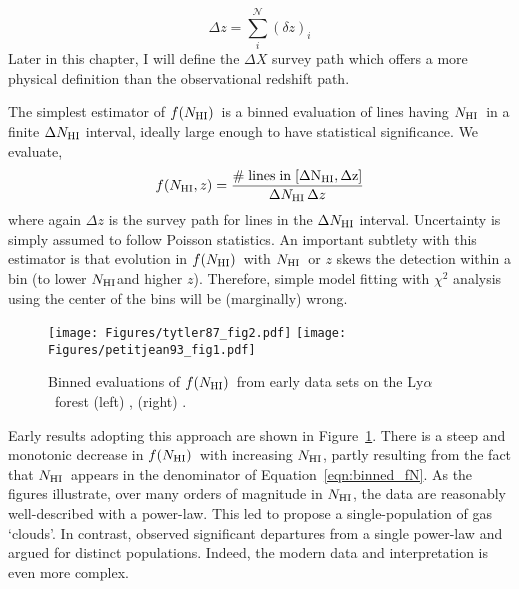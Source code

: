 \documentclass[graybox]{svmult}
\def\lya{Ly$\alpha$}
\def\smm{\sum\limits}
\newcommand{\mnhi}{N_{\rm HI}}
\newcommand{\nhi}{$\mnhi$}
\def\mfnhi{f(\mnhi)}
\def\fnhi{$\mfnhi$}
\begin{document}
\begin{equation}
\Delta z = \smm_i^{\mathcal{N}} (\delta z)_i
\label{eqn:survey_path}
\end{equation}
Later in this chapter,
I will define the $\Delta X$ survey path which offers
a more physical definition than the observational redshift path.

The simplest estimator of \fnhi\ is a binned evaluation
of lines having \nhi\ in a finite $\Delta \mnhi$ interval,
ideally large enough to have statistical significance.
We evaluate,
\begin{equation}
f(\mnhi,z) = \frac{\rm \# \; lines \; in \; [\Delta \mnhi,\Delta z]}{
\Delta\mnhi \, \Delta z}
\label{eqn:binned_fN}
 \end{equation}
where again $\Delta z$ is the survey path for lines
in the $\Delta \mnhi$ interval.  Uncertainty is simply
assumed to follow Poisson statistics. 
An important subtlety with this estimator is that 
evolution in \fnhi\ with \nhi\ or $z$ 
skews the detection within a bin (to lower \nhi and higher $z$).
Therefore, simple model fitting with $\chi^2$ analysis using the 
center of the bins will be (marginally) wrong.

%
\begin{figure}[b]
\sidecaption
\texttt{[image: Figures/tytler87\_fig2.pdf]}
\texttt{[image: Figures/petitjean93\_fig1.pdf]}
%
\caption{Binned evaluations of \fnhi\ from early data sets
on the \lya\ forest (left) \cite{tytler87}, (right) \cite{petit93}.
}
\label{fig:binfN}       %
\end{figure}

Early results adopting this approach are shown in 
Figure~\ref{fig:binfN}.  There is a steep and monotonic
decrease in \fnhi\ with increasing \nhi, partly
resulting from the fact that \nhi\ appears in the
denominator of Equation~\ref{eqn:binned_fN}.  As the figures
illustrate, over many orders of magnitude in \nhi, the
data are reasonably  well-described with a power-law.
This led \cite{tytler87}
to propose a single-population of gas `clouds'.
In contrast, \cite{petit93} observed significant
departures from a single power-law and 
argued for distinct populations. Indeed, the
modern data and interpretation is even more complex.
\end{document}
